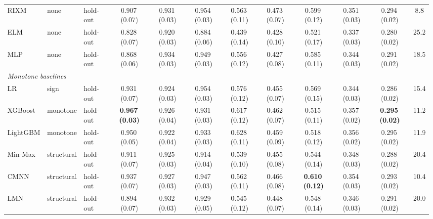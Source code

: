 \begin{table}[!tbp]
{\begin{tabular}{lllccccccccc}
RIXM & none & hold-out & 0.907\,{\scriptsize(0.07)} & 0.931\,{\scriptsize(0.03)} & 0.954\,{\scriptsize(0.03)} & 0.563\,{\scriptsize(0.11)} & 0.473\,{\scriptsize(0.07)} & 0.599\,{\scriptsize(0.12)} & 0.351\,{\scriptsize(0.03)} & 0.294\,{\scriptsize(0.02)} & 8.8 \\
ELM & none & hold-out & 0.828\,{\scriptsize(0.07)} & 0.920\,{\scriptsize(0.03)} & 0.884\,{\scriptsize(0.06)} & 0.439\,{\scriptsize(0.14)} & 0.428\,{\scriptsize(0.10)} & 0.521\,{\scriptsize(0.17)} & 0.337\,{\scriptsize(0.03)} & 0.280\,{\scriptsize(0.02)} & 25.2 \\
MLP & none & hold-out & 0.868\,{\scriptsize(0.06)} & 0.934\,{\scriptsize(0.03)} & 0.949\,{\scriptsize(0.03)} & 0.556\,{\scriptsize(0.12)} & 0.427\,{\scriptsize(0.08)} & 0.585\,{\scriptsize(0.11)} & 0.344\,{\scriptsize(0.03)} & 0.291\,{\scriptsize(0.02)} & 18.5 \\
\midrule
\multicolumn{12}{l}{\textit{Monotone baselines}} \\
LR & sign & hold-out & 0.931\,{\scriptsize(0.07)} & 0.924\,{\scriptsize(0.03)} & 0.954\,{\scriptsize(0.03)} & 0.576\,{\scriptsize(0.12)} & 0.455\,{\scriptsize(0.07)} & 0.569\,{\scriptsize(0.15)} & 0.344\,{\scriptsize(0.03)} & 0.286\,{\scriptsize(0.02)} & 15.4 \\
XGBoost & monotone & hold-out & \textbf{0.967\,{\scriptsize(0.03)}} & 0.926\,{\scriptsize(0.04)} & 0.931\,{\scriptsize(0.03)} & 0.617\,{\scriptsize(0.12)} & 0.462\,{\scriptsize(0.07)} & 0.515\,{\scriptsize(0.11)} & 0.357\,{\scriptsize(0.02)} & \textbf{0.295\,{\scriptsize(0.02)}} & 11.2 \\
LightGBM & monotone & hold-out & 0.950\,{\scriptsize(0.05)} & 0.922\,{\scriptsize(0.04)} & 0.933\,{\scriptsize(0.03)} & 0.628\,{\scriptsize(0.11)} & 0.459\,{\scriptsize(0.09)} & 0.518\,{\scriptsize(0.12)} & 0.356\,{\scriptsize(0.02)} & 0.295\,{\scriptsize(0.02)} & 11.9 \\
Min-Max & structural & hold-out & 0.911\,{\scriptsize(0.07)} & 0.925\,{\scriptsize(0.03)} & 0.914\,{\scriptsize(0.04)} & 0.539\,{\scriptsize(0.10)} & 0.455\,{\scriptsize(0.08)} & 0.544\,{\scriptsize(0.14)} & 0.348\,{\scriptsize(0.03)} & 0.288\,{\scriptsize(0.02)} & 20.4 \\
CMNN & structural & hold-out & 0.937\,{\scriptsize(0.07)} & 0.927\,{\scriptsize(0.03)} & 0.947\,{\scriptsize(0.03)} & 0.562\,{\scriptsize(0.11)} & 0.466\,{\scriptsize(0.08)} & \textbf{0.610\,{\scriptsize(0.12)}} & 0.354\,{\scriptsize(0.03)} & 0.293\,{\scriptsize(0.02)} & 10.4 \\
LMN & structural & hold-out & 0.894\,{\scriptsize(0.07)} & 0.932\,{\scriptsize(0.03)} & 0.929\,{\scriptsize(0.05)} & 0.545\,{\scriptsize(0.12)} & 0.448\,{\scriptsize(0.07)} & 0.548\,{\scriptsize(0.14)} & 0.346\,{\scriptsize(0.03)} & 0.291\,{\scriptsize(0.02)} & 20.0 \\

\end{tabular}}
\end{table}
